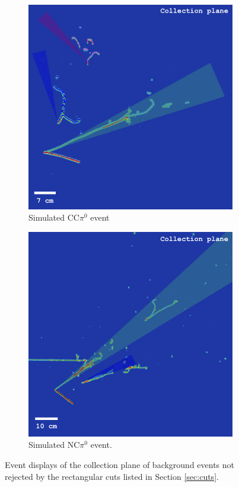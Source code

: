 \begin{figure}[htbp]
\centering
  \begin{subfigure}{0.45\textwidth}
  \includegraphics[width=\linewidth]{figures/ccpi0.png}
    \caption{Simulated CC$\pi^0$ event} \label{fig:evd_bkg_ccpi0}
    \end{subfigure} 
  \hfill
  \begin{subfigure}{0.45\textwidth}	
  \includegraphics[width=\linewidth]{figures/ncpi0.png}
  \caption{Simulated NC$\pi^0$ event.}  \label{fig:evd_bkg_ncpi0}
  \end{subfigure}
  \caption{Event displays of the collection plane of background events not rejected by the rectangular cuts listed in Section \ref{sec:cuts}.}
  \label{fig:evd_bkg}
\end{figure}


